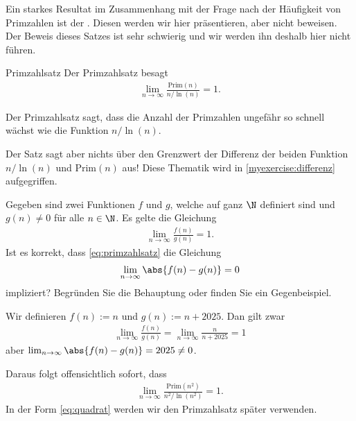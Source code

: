 Ein starkes Resultat im Zusammenhang mit der Frage nach der Häufigkeit von Primzahlen ist der . Diesen werden wir hier präsentieren, aber nicht beweisen. Der Beweis dieses Satzes ist sehr schwierig und wir werden ihn deshalb hier nicht führen.

\begin{mytheorem}{Primzahlsatz}\label{mytheorem:primzahlsatz}
	Der Primzahlsatz besagt
	\begin{align}\label{eq:primzahlsatz}
		\lim_{n\to\infty} \frac{\text{Prim}(n)}{n/\ln (n)} = 1.
	\end{align}
\end{mytheorem}
Der Primzahlsatz sagt, dass die Anzahl der Primzahlen ungefähr so schnell wächst wie die Funktion $n / \ln(n)$.

Der Satz sagt aber nichts über den Grenzwert der Differenz der beiden Funktion $n/\ln (n)$ und $\text{Prim}(n)$ aus! Diese Thematik wird in \cref{myexercise:differenz} aufgegriffen.

\begin{myexercise}\label{myexercise:differenz}
	Gegeben sind zwei Funktionen $f$ und $g$, welche auf ganz $\N$ definiert sind und $g(n) \neq 0$ für alle $n\in\N$. Es gelte die Gleichung
	\begin{align*}
		\lim_{n\to\infty}\frac{f(n)}{g(n)} = 1.
	\end{align*}
	Ist es korrekt, dass \cref{eq:primzahlsatz} die Gleichung
	\begin{align*}
		\lim_{n\to\infty} \abs{f(n) - g(n)} = 0
	\end{align*}
	impliziert? Begründen Sie die Behauptung oder finden Sie ein Gegenbeispiel.
	\begin{myanswer}
		Wir definieren $f(n) := n$ und $g(n) := n + 2025$. Dan gilt zwar
		\begin{align*}
			\lim_{n\to\infty}\frac{f(n)}{g(n)} = \lim_{n\to\infty}\frac{n}{n + 2025} = 1
		\end{align*}
		aber $\lim_{n\to\infty} \abs{f(n) - g(n)} = 2025 \neq 0$.
	\end{myanswer}
\end{myexercise}

Daraus folgt offensichtlich sofort, dass
\begin{align}\label{eq:quadrat}
	\lim_{n\to\infty} \frac{\text{Prim}(n^2)}{n^2/\ln (n^2)} = 1.
\end{align}
In der Form \ref{eq:quadrat} werden wir den Primzahlsatz später verwenden.

